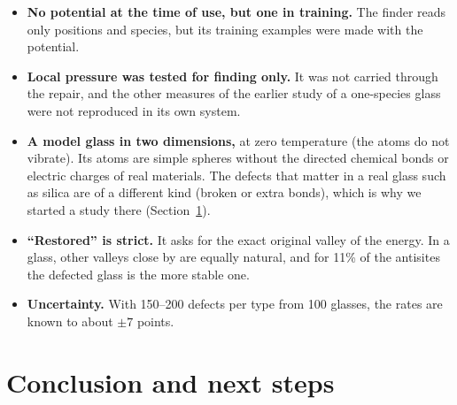 \documentclass[10pt]{article}
\newif\iffinders
\begin{document}
\begin{itemize}
\item \textbf{No potential at the time of use, but one in training.} The finder reads only positions and species, but its training examples were made with the potential.
\item \textbf{Local pressure was tested for finding only.} It was not carried through the repair, and the other measures of the earlier study of a one-species glass~\citep{laakkonen1988} were not reproduced in its own system.
\item \textbf{A model glass in two dimensions,} at zero temperature (the atoms do not vibrate). Its atoms are simple spheres without the directed chemical bonds or electric charges of real materials. The defects that matter in a real glass such as silica are of a different kind (broken or extra bonds), which is why we started a study there (Section~\ref{sec:next}).
\item \textbf{``Restored'' is strict.} It asks for the exact original valley of the energy. In a glass, other valleys close by are equally natural, and for 11\% of the antisites the defected glass is the more stable one.
\item \textbf{Uncertainty.} With 150--200 defects per type from 100 glasses, the rates are known to about $\pm 7$ points. \iffinders Repeating the training changes the share of all defects found by less than one point (Sections~\ref{sec:stability} and~\ref{sec:finders}), so it is the number of test defects, not the training, that limits the precision. The finder of the main results itself was trained once.\fi
\iffinders
\item \textbf{The transformer and the CNN were compared on finding only.} They were trained from random weights for 20,000 updates. They were not started from a denoiser, and the repair was not repeated with them.
\fi
\end{itemize}

\section{Conclusion and next steps}
\label{sec:next}
\end{document}

